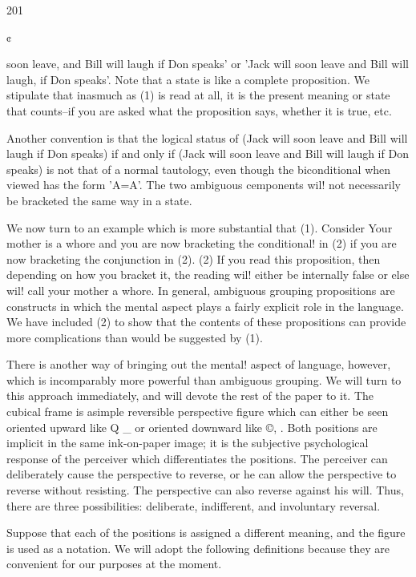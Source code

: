 \documentclass[10pt,twoside]{memoir}
\begin{document}
\begin{enumerate}
{{{{{201 


¢ 


soon leave, and Bill will laugh if Don speaks' or 'Jack will soon leave and Bill 
will laugh, if Don speaks'. Note that a state is like a complete proposition. 
We stipulate that inasmuch as (1) is read at all, it is the present meaning or 
state that counts--if you are asked what the proposition says, whether it is 
true, etc. 

Another convention is that the logical status of 
(Jack will soon leave and Bill will laugh if Don speaks) if and only if (Jack 
will soon leave and Bill will laugh if Don speaks) 
is not that of a normal tautology, even though the biconditional when 
viewed has the form 'A=A'. The two ambiguous cemponents wil! not 
necessarily be bracketed the same way in a state. 

We now turn to an example which is more substantial that (1). 
Consider 
Your mother is a whore and you are now bracketing the conditional! in (2) if 
you are now bracketing the conjunction in (2). (2) 
If you read this proposition, then depending on how you bracket it, the 
reading wil! either be internally false or else wil! call your mother a whore. In 
general, ambiguous grouping propositions are constructs in which the mental 
aspect plays a fairly explicit role in the language. We have included (2) to 
show that the contents of these propositions can provide more complications 
than would be suggested by (1). 


There is another way of bringing out the mental! aspect of language, 
however, which is incomparably more powerful than ambiguous grouping. 
We will turn to this approach immediately, and will devote the rest of the 
paper to it. The cubical frame is asimple reversible perspective figure 
which can either be seen oriented upward like Q _ or oriented downward 
like ©, . Both positions are implicit in the same ink-on-paper image; it is 
the subjective psychological response of the perceiver which differentiates 
the positions. The perceiver can deliberately cause the perspective to reverse, 
or he can allow the perspective to reverse without resisting. The perspective 
can also reverse against his will. Thus, there are three possibilities: deliberate, 
indifferent, and involuntary reversal. 

Suppose that each of the positions is assigned a different meaning, and 
the figure is used as a notation. We will adopt the following definitions 
because they are convenient for our purposes at the moment. 

}}}}}
\end{enumerate}
\end{document}
